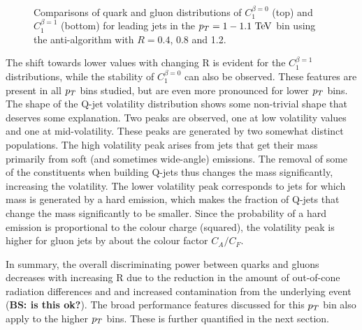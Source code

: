 \begin{figure}
\begin{center}
\\
\caption{Comparisons of quark and gluon distributions of $C_1^{\beta=0}$ (top) and $C_1^{\beta=1}$ (bottom) 
for leading jets in the $\pt=1-1.1 \TeV$ bin using the anti-\kT algorithm with $R=0.4$, 0.8 and 1.2. }
\label{fig:Rdep_qg_C_pt1000}
\end{center}
\end{figure}
The shift towards lower values with changing R is evident for the $C_1^{\beta=1}$ distributions, while the stability
of $C_1^{\beta=0}$ can also be observed. These features are present in all $p_T$ bins studied, but are even more
pronounced for lower $p_T$ bins. The shape of the Q-jet volatility distribution shows some non-trivial shape that
deserves some explanation. Two peaks are observed, one at low volatility values and one at mid-volatility. These
peaks are generated by two somewhat distinct populations. The high volatility peak arises from jets that get their
mass primarily from soft (and sometimes wide-angle) emissions. The removal of some of the constituents when
building Q-jets thus changes the mass significantly, increasing the volatility. The lower volatility peak corresponds
to jets for which mass is generated by a hard emission, which makes the fraction of Q-jets that change 
the mass significantly to be smaller. Since the probability of a hard emission is proportional to the colour
charge (squared),  the volatility peak is higher for gluon jets by about the colour factor $C_A/C_F$. 



In summary, the overall discriminating power between quarks and gluons
 decreases with increasing R due to the reduction in the amount of out-of-cone radiation differences and 
 and increased contamination from the underlying event ({\bf BS: is this ok?}). The broad performance features discussed for this $p_T$ bin also apply to the higher
$p_T$ bins. These  is further quantified in the next section. 



